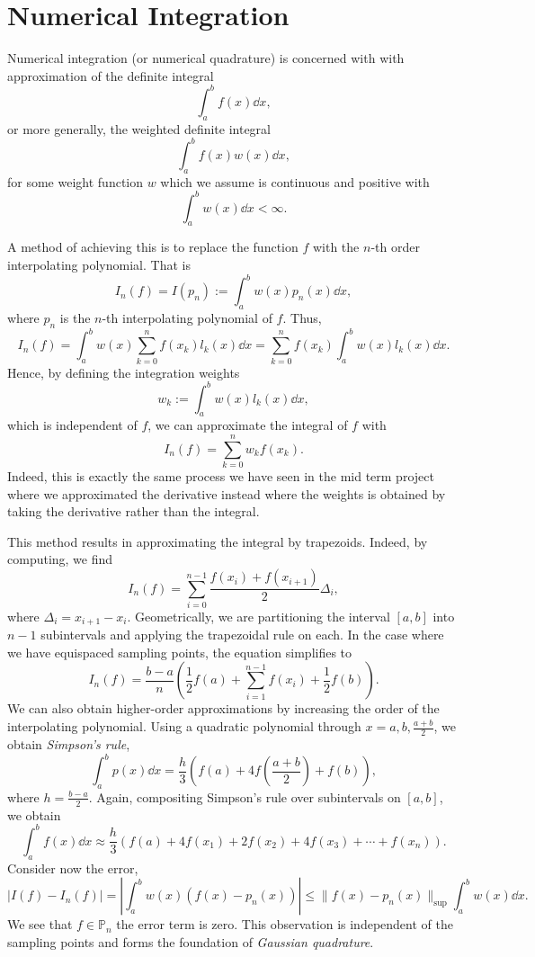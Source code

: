 \documentclass[
]{article}
\theoremstyle{definition}
\theoremstyle{definition}
\begin{document}
\newpage

\hypertarget{numerical-integration}{%
\section{Numerical Integration}\label{numerical-integration}}

Numerical integration (or numerical quadrature) is concerned with with
approximation of the definite integral \[\int_a^b f(x) \dd x,\] or more
generally, the weighted definite integral \[\int_a^b f(x)w(x) \dd x,\]
for some weight function \(w\) which we assume is continuous and
positive with \[\int_a^b w(x) \dd x < \infty.\]

A method of achieving this is to replace the function \(f\) with the
\(n\)-th order interpolating polynomial. That is
\[I_n(f) = I(p_n) := \int_a^b w(x) p_n(x) \dd x,\] where \(p_n\) is the
\(n\)-th interpolating polynomial of \(f\). Thus,
\[I_n(f) = \int_a^b w(x) \sum_{k = 0}^n f(x_k)l_k(x) \dd x = 
  \sum_{k = 0}^n f(x_k) \int_a^b w(x)l_k(x) \dd x.\] Hence, by defining
the integration weights \[w_k := \int_a^b w(x) l_k(x) \dd x,\] which is
independent of \(f\), we can approximate the integral of \(f\) with
\[I_n(f) = \sum_{k = 0}^n w_k f(x_k).\] Indeed, this is exactly the same
process we have seen in the mid term project where we approximated the
derivative instead where the weights is obtained by taking the
derivative rather than the integral.

This method results in approximating the integral by trapezoids. Indeed,
by computing, we find
\[I_n(f) = \sum_{i = 0}^{n - 1}\frac{f(x_i) + f(x_{i + 1})}{2}\Delta_i,\]
where \(\Delta_i = x_{i + 1} - x_i\). Geometrically, we are partitioning
the interval \([a, b]\) into \(n - 1\) subintervals and applying the
trapezoidal rule on each. In the case where we have equispaced sampling
points, the equation simplifies to
\[I_n(f) = \frac{b - a}{n}\left(\frac{1}{2}f(a) + \sum_{i = 1}^{n - 1}f(x_i) 
  + \frac{1}{2}f(b)\right).\] We can also obtain higher-order
approximations by increasing the order of the interpolating polynomial.
Using a quadratic polynomial through \(x = a, b, \frac{a + b}{2}\), we
obtain \emph{Simpson's rule},
\[\int_a^b p(x) \dd x = \frac{h}{3}\left(f(a) + 4f\left(\frac{a + b}{2}\right) + f(b)\right),\]
where \(h = \frac{b - a}{2}\). Again, compositing Simpson's rule over
subintervals on \([a, b]\), we obtain
\[\int_a^b f(x) \dd x \approx \frac{h}{3}(f(a) + 4f(x_1) + 2f(x_2) + 4f(x_3) + \cdots + 
  f(x_n)).\] Consider now the error,
\[|I(f) - I_n(f)| = \left|\int_a^b w(x)(f(x) - p_n(x))\right| 
  \le \|f(x) - p_n(x)\|_{\sup} \int_a^b w(x) \dd x.\] We see that
\(f \in \mathbb{P}_n\) the error term is zero. This observation is
independent of the sampling points and forms the foundation of
\emph{Gaussian quadrature}.
\end{document}

